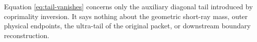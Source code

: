 \begin{remark}
Equation \eqref{eq:tail-vanishes} concerns only the auxiliary diagonal
tail introduced by coprimality inversion.  It says nothing about the
geometric short-ray mass, outer physical endpoints, the ultra-tail of the
original packet, or downstream boundary reconstruction.
\end{remark}
